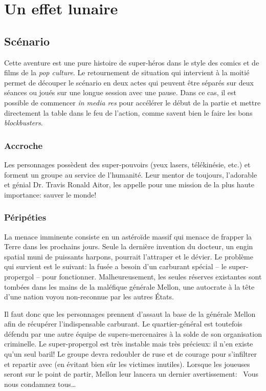 \chapter{Un effet lunaire}

\section{Scénario}

Cette aventure est une pure histoire de super-héros dans le style des comics et de films de la \emph{pop culture}.
Le retournement de situation qui intervient à la moitié permet de découper le scénario en deux actes qui peuvent être séparés sur deux séances ou joués sur une longue session avec une pause.
Dans ce cas, il est possible de commencer \emph{in media res} pour accélérer le début de la partie et mettre directement la table dans le feu de l'action, comme savent bien le faire les bons \emph{blockbusters}.

\subsection{Accroche}

Les personnages possèdent des super-pouvoirs (yeux lasers, télékinésie, etc.) et forment un groupe au service de l'humanité.
Leur mentor de toujours, l'adorable et génial Dr. Travis Ronald Aitor, les appelle pour une mission de la plus haute importance: sauver le monde!

\subsection{Péripéties}

La menace imminente consiste en un astéroïde massif qui menace de frapper la Terre dans les prochains jours.
Seule la dernière invention du docteur, un engin spatial muni de puissants harpons, pourrait l'attraper et le dévier.
Le problème qui survient est le suivant: la fusée a besoin d'un carburant spécial -- le super-propergol -- pour fonctionner.
Malheureusement, les seules réserves existantes sont tombées dans les mains de la maléfique générale Mellon, une autocrate à la tête d'une nation voyou non-reconnue par les autres États.

Il faut donc que les personnages prennent d'assaut la base de la générale Mellon afin de récupérer l'indispensable carburant.
Le quartier-général est toutefois défendu par une autre équipe de supers-mercenaires à la solde de son organisation criminelle.
Le super-propergol est très instable mais très précieux: il n'en existe qu'un seul baril!
Le groupe devra redoubler de ruse et de courage pour s'infiltrer et repartir avec (en évitant bien sûr les victimes inutiles).
Lorsque les joueuses seront sur le point de partir, Mellon leur lancera un dernier avertissement: \og Vous nous condamnez tous\dots \fg

